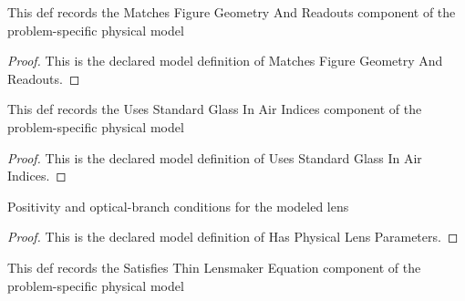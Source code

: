 \begin{definition}
  \label{def:physics:phyx-mini-0064:phyxminiproblems-problemphyxmini0064-matchesfiguregeometryandreadouts}
  This def records the Matches Figure Geometry And Readouts component of the problem-specific physical model
\end{definition}
\begin{proof}
  This is the declared model definition of Matches Figure Geometry And Readouts.
\end{proof}
\begin{definition}
  \label{def:physics:phyx-mini-0064:phyxminiproblems-problemphyxmini0064-usesstandardglassinairindices}
  This def records the Uses Standard Glass In Air Indices component of the problem-specific physical model
\end{definition}
\begin{proof}
  This is the declared model definition of Uses Standard Glass In Air Indices.
\end{proof}
\begin{definition}
  \label{def:physics:phyx-mini-0064:phyxminiproblems-problemphyxmini0064-hasphysicallensparameters}
  Positivity and optical-branch conditions for the modeled lens
\end{definition}
\begin{proof}
  This is the declared model definition of Has Physical Lens Parameters.
\end{proof}
\begin{definition}
  \label{def:physics:phyx-mini-0064:phyxminiproblems-problemphyxmini0064-satisfiesthinlensmakerequation}
  This def records the Satisfies Thin Lensmaker Equation component of the problem-specific physical model
\end{definition}

